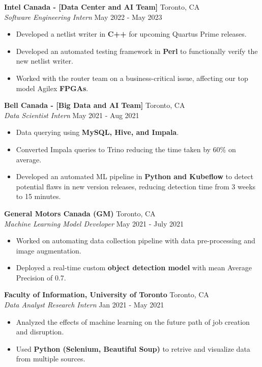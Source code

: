 \documentclass[a4paper]{article}
\begin{document}
\textbf{Intel Canada - [Data Center and AI Team]} \hfill Toronto, CA\\
\textit{Software Engineering Intern} \hfill May 2022 - May 2023\\
\vspace{-3mm}
\begin{itemize} \itemsep 1pt
	\item Developed a netlist writer in \textbf{C++} for upcoming Quartus Prime releases.
	\item Developed an automated testing framework in \textbf{Perl} to functionally verify the new netlist writer.
	\item Worked with the router team on a business-critical issue, affecting our top model Agilex \textbf{FPGAs}. 
\end{itemize}

\textbf{Bell Canada - [Big Data and AI Team]} \hfill Toronto, CA\\
\textit{Data Scientist Intern} \hfill May 2021 - Aug 2021\\
\vspace{-3mm}
\begin{itemize} \itemsep 1pt
	\item Data querying using \textbf{MySQL, Hive, and Impala}. 
	\item Converted Impala queries to Trino reducing the time taken by 60\% on average.
	\item Developed an automated ML pipeline in \textbf{Python and Kubeflow} to detect potential flaws in new version releases, reducing detection time from 3 weeks to 15 minutes.
\end{itemize}

\textbf{General Motors Canada (GM)} \hfill Toronto, CA\\
\textit{Machine Learning Model Developer} \hfill May 2021 - July 2021\\
\vspace{-3mm}
\begin{itemize} \itemsep 1pt
	\item Worked on automating data collection pipeline with data pre-processing and image augmentation.
	\item Deployed a real-time custom \textbf{object detection model} with mean Average Precision of 0.7.
\end{itemize}

\textbf{Faculty of Information, University of Toronto} \hfill Toronto, CA\\
\textit{Data Analyst Research Intern} \hfill Jan 2021 - May 2021\\
\vspace{-3mm}
\begin{itemize} \itemsep 1pt
    \item Analyzed the effects of machine learning on the future path of job creation and disruption.
	\item Used \textbf{Python (Selenium, Beautiful Soup)} to retrive and visualize data from multiple sources.
\end{itemize}
\end{document}
